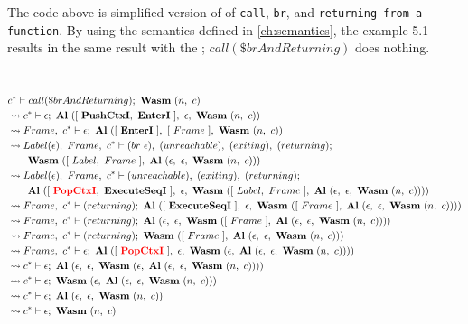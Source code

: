The code above is simplified version of \spectecp{} of \texttt{call},
\texttt{br}, and \texttt{returning from a function}.
By using the semantics defined in \cref{ch:semantics}, the example 5.1 results in the same result with the \officialp{}; $call(\$brAndReturning)$ does nothing.


 \\
\begin{align}
  &c^* \vdash call(\$brAndReturning); ~ \textbf{Wasm} ~ (n, ~ c)
  \label{eq:resolve-1} \\
  &\leadsto c^* \vdash \epsilon; ~ \textbf{Al} ~ ([ ~ \textbf{PushCtxI}, ~ \textbf{EnterI} ~ ], ~ \epsilon, ~ \textbf{Wasm} ~ (n, ~ c))
  \label{eq:resolve-2} \\
  &\leadsto Frame, ~ c^* \vdash \epsilon; ~ \textbf{Al} ~ ([ ~ \textbf{EnterI} ~ ], ~ [ ~ Frame ~ ], ~ \textbf{Wasm} ~ (n, ~ c))
  \label{eq:resolve-3} \\
  &\leadsto Label(\epsilon), ~ Frame, ~ c^* \vdash (br ~ \epsilon), ~ (unreachable), ~ (exiting), ~ (returning); \\
  &\quad\quad \textbf{Wasm} ~ ([ ~ Label, ~ Frame ~ ], ~ \textbf{Al} ~ (\epsilon, ~ \epsilon, ~ \textbf{Wasm} ~ (n, ~ c)))
  \label{eq:resolve-4} \\
  &\leadsto Label(\epsilon), ~ Frame, ~ c^* \vdash (unreachable), ~ (exiting), ~ (returning); \\
  &\quad\quad \textbf{Al} ~ ([ ~ \textcolor{red}{\textbf{PopCtxI}}, ~ \textbf{ExecuteSeqI} ~ ], ~ \epsilon, ~ \textbf{Wasm} ~ ([ ~ Label, ~ Frame ~ ], ~ \textbf{Al} ~ (\epsilon, ~ \epsilon, ~ \textbf{Wasm} ~ (n, ~ c))))
  \label{eq:resolve-5} \\
  &\leadsto Frame, ~ c^* \vdash (returning); ~
    \textbf{Al} ~ ([ ~ \textbf{ExecuteSeqI} ~ ], ~ \epsilon, ~ \textbf{Wasm} ~ ([ ~ Frame ~ ], ~ \textbf{Al} ~ (\epsilon, ~ \epsilon, ~ \textbf{Wasm} ~ (n, ~ c))))
  \label{eq:resolve-6} \\
  &\leadsto Frame, ~ c^* \vdash (returning); ~
    \textbf{Al} ~ (\epsilon, ~ \epsilon, ~ \textbf{Wasm} ~ ([ ~ Frame ~ ], ~ \textbf{Al} ~ (\epsilon, ~ \epsilon, ~ \textbf{Wasm} ~ (n, ~ c))))
  \label{eq:resolve-7} \\
  &\leadsto Frame, ~ c^* \vdash (returning); ~ \textbf{Wasm} ~ ([ ~ Frame ~ ], ~ \textbf{Al} ~ (\epsilon, ~ \epsilon, ~ \textbf{Wasm} ~ (n, ~ c)))
  \label{eq:resolve-8} \\
  &\leadsto Frame, ~ c^* \vdash \epsilon; ~
    \textbf{Al} ~ ([ ~ \textcolor{red}{\textbf{PopCtxI}} ~ ], ~ \epsilon, ~ \textbf{Wasm} ~ (\epsilon, ~ \textbf{Al} ~ (\epsilon, ~ \epsilon, ~ \textbf{Wasm} ~ (n, ~ c))))
  \label{eq:resolve-9} \\
  &\leadsto c^* \vdash \epsilon; ~
    \textbf{Al} ~ (\epsilon, ~ \epsilon, ~ \textbf{Wasm} ~ (\epsilon, ~ \textbf{Al} ~ (\epsilon, ~ \epsilon, ~ \textbf{Wasm} ~ (n, ~ c))))
  \label{eq:resolve-10} \\
  &\leadsto c^* \vdash \epsilon; ~ \textbf{Wasm} ~ (\epsilon, ~ \textbf{Al} ~ (\epsilon, ~ \epsilon, ~ \textbf{Wasm} ~ (n, ~ c)))
  \label{eq:resolve-11} \\
  &\leadsto c^* \vdash \epsilon; ~ \textbf{Al} ~ (\epsilon, ~ \epsilon, ~ \textbf{Wasm} ~ (n, ~ c))
  \label{eq:resolve-12} \\
  &\leadsto c^* \vdash \epsilon; ~ \textbf{Wasm} ~ (n, ~ c)
  \label{eq:resolve-13}
\end{align}
